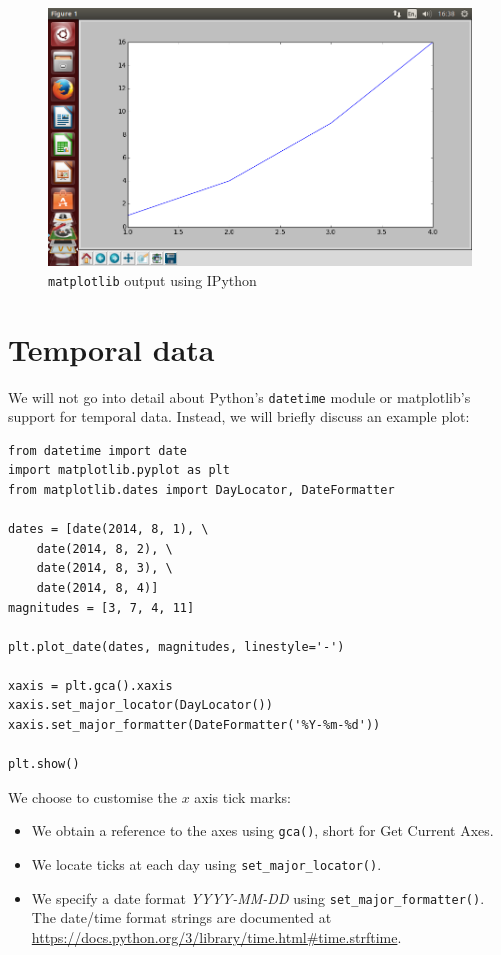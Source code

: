 \documentclass[a4paper,twoside,titlepage]{memoir}
\newcommand{\shellcmd}{\texttt}
\begin{document}
\begin{figure}
	\centering
	\includegraphics[width=\textwidth]{matplotlib.png}
	\caption{\shellcmd{matplotlib} output using IPython}
	\label{fig:plt}
\end{figure}

\section{Temporal data}
We will not go into detail about Python's \shellcmd{datetime} module or matplotlib's support for temporal data.  Instead, we will briefly discuss an example plot:
\index{plot\_date@\shellcmd{plot\_date()}}
\begin{verbatim}
from datetime import date
import matplotlib.pyplot as plt
from matplotlib.dates import DayLocator, DateFormatter

dates = [date(2014, 8, 1), \
	date(2014, 8, 2), \
	date(2014, 8, 3), \
	date(2014, 8, 4)]
magnitudes = [3, 7, 4, 11]

plt.plot_date(dates, magnitudes, linestyle='-')

xaxis = plt.gca().xaxis
xaxis.set_major_locator(DayLocator())
xaxis.set_major_formatter(DateFormatter('%Y-%m-%d'))

plt.show()
\end{verbatim}
We choose to customise the $x$ axis tick marks:
\begin{itemize}
	\item We obtain a reference to the axes using \shellcmd{gca()}, short for Get Current Axes.
	\item We locate ticks at each day using \shellcmd{set\_major\_locator()}.
	\item We specify a date format \textit{YYYY-MM-DD} using \shellcmd{set\_major\_formatter()}.  The date/time format strings are documented at \url{https://docs.python.org/3/library/time.html#time.strftime}.
\end{itemize}
\end{document}
